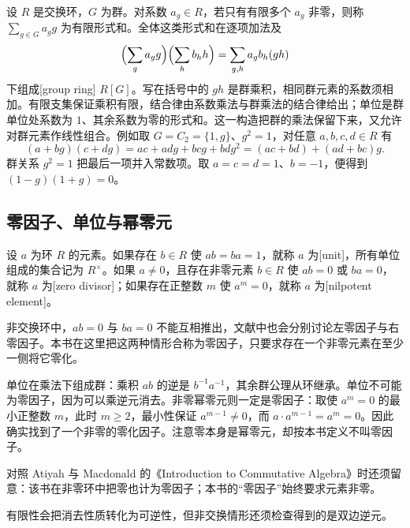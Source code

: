 \ProseParagraphBreak
设 \(R\) 是交换环，\(G\) 为群。对系数 \(a_g\in R\)，若只有有限多个 \(a_g\) 非零，则称 \(\sum_{g\in G}a_gg\) 为有限形式和。全体这类形式和在逐项加法及
\[
	\Bigl(\sum_g a_gg\Bigr)\Bigl(\sum_h b_hh\Bigr) =\sum_{g,h}a_gb_h(gh)
\]
下组成[group ring] \(R[G]\)。写在括号中的 \(gh\) 是群乘积，相同群元素的系数须相加。有限支集保证乘积有限，结合律由系数乘法与群乘法的结合律给出；单位是群单位处系数为 \(1\)、其余系数为零的形式和。这一构造把群的乘法保留下来，又允许对群元素作线性组合。例如取 \(G=C_2=\{1,g\}\)、\(g^2=1\)，对任意 \(a,b,c,d\in R\) 有
\[
	(a+bg)(c+dg) =ac+adg+bcg+bdg^2 =(ac+bd)+(ad+bc)g.
\]
群关系 \(g^2=1\) 把最后一项并入常数项。取 \(a=c=d=1\)、\(b=-1\)，便得到 \((1-g)(1+g)=0\)。

\subsection{零因子、单位与幂零元}
\label{b1:subsec:1001:03}
\begin{definition}\label{b1:def:units-zero-nil}
	设 \(a\) 为环 \(R\) 的元素。如果存在 \(b\in R\) 使 \(ab=ba=1\)，就称 \(a\) 为[unit]，所有单位组成的集合记为 \(R^\times\)。如果 \(a\ne0\)，且存在非零元素 \(b\in R\) 使 \(ab=0\) 或 \(ba=0\)，就称 \(a\) 为[zero divisor]；如果存在正整数 \(m\) 使 \(a^m=0\)，就称 \(a\) 为[nilpotent element]。
\end{definition}
非交换环中，\(ab=0\) 与 \(ba=0\) 不能互相推出，文献中也会分别讨论左零因子与右零因子。本书在这里把这两种情形合称为零因子，只要求存在一个非零元素在至少一侧将它零化。

\ProseParagraphBreak
单位在乘法下组成群：乘积 \(ab\) 的逆是 \(b^{-1}a^{-1}\)，其余群公理从环继承。单位不可能为零因子，因为可以乘逆元消去。非零幂零元则一定是零因子：取使 \(a^m=0\) 的最小正整数 \(m\)，此时 \(m\geq2\)，最小性保证 \(a^{m-1}\ne0\)，而 \(a\cdot a^{m-1}=a^m=0\)。因此确实找到了一个非零的零化因子。注意零本身是幂零元，却按本书定义不叫零因子。

\ProseParagraphBreak
对照 Atiyah 与 Macdonald 的《Introduction to Commutative Algebra》时还须留意：该书在非零环中把零也计为零因子\cite[Chapter 1, p.~2]{AtiyahMacdonald1969CommutativeAlgebra}；本书的“零因子”始终要求元素非零。

\ProseParagraphBreak
有限性会把消去性质转化为可逆性，但非交换情形还须检查得到的是双边逆元。

